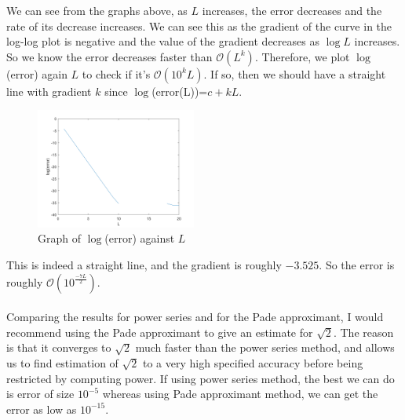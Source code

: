 \documentclass[10pt]{article}
\begin{document}
\noindent We can see from the graphs above, as $L$ increases, the error decreases and the rate of its decrease increases. We can see this as the gradient of the curve in the log-log plot is negative and the value of the gradient decreases as $\log L$ increases.\\
So we know the error decreases faster than $\mathcal{O}(L^k)$. Therefore, we plot $\log$(error) again $L$ to check if it's $\mathcal{O}(10^kL)$. If so, then we should have a straight line with gradient $k$ since $\log$(error(L))=$c+kL$.
\begin{figure}[H]
\centering
\includegraphics[width=0.47\textwidth]{Files/q2,L=20log.png}
\caption{Graph of $\log$(error) against $L$}
\end{figure}
\noindent This is indeed a straight line, and the gradient is roughly $-3.525$. So the error is roughly \underline{$\mathcal{O}(10^{\frac{-7L}{2}})$}.\\\\
Comparing the results for power series and for the Pade approximant, I would recommend using the Pade approximant to give an estimate for $\sqrt{2}$. The reason is that it converges to $\sqrt{2}$ much faster than the power series method, and allows us to find estimation of $\sqrt{2}$ to a very high specified accuracy before being restricted by computing power. If using power series method, the best we can do is error of size $10^{-5}$ whereas using Pade approximant method, we can get the error as low as $10^{-15}$.\\
\end{document}
